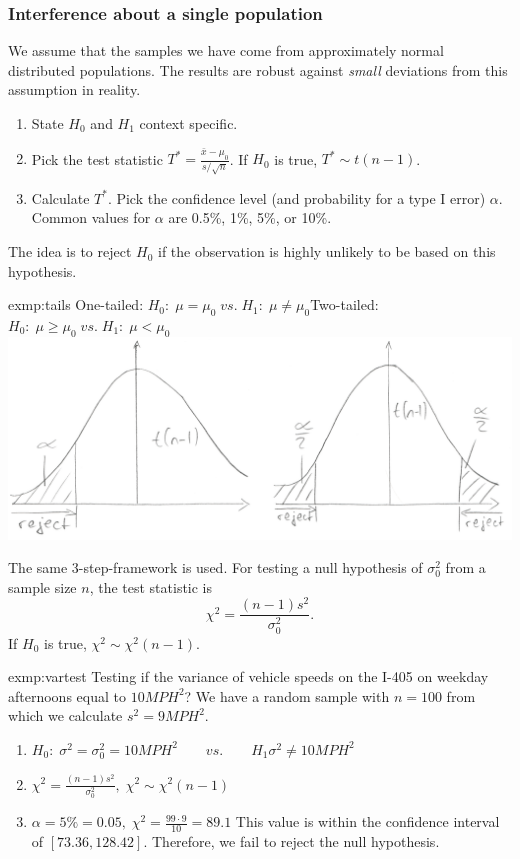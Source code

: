 	\subsubsection{Interference about a single population}
		We assume that the samples we have come from approximately normal distributed populations. The results are robust against \emph{small} deviations from this assumption in reality.
			\begin{enumerate}
				\item State $H_0$ and $H_1$ context specific.
				\item Pick the test statistic $T^*=\frac{\bar{x}-\mu_0}{s/\sqrt{n}}$. If $H_0$ is true, $T^*\sim t(n-1)$.
				\item Calculate $T^*$. Pick the confidence level (and probability for a type I error) $\alpha$. Common values for $\alpha$ are 0.5\%, 1\%, 5\%, or 10\%.
			\end{enumerate}
			The idea is to reject $H_0$ if the observation is highly unlikely to be based on this hypothesis.
			\begin{exmp}{exmp:tails}
				One-tailed: $H_0:\;\mu=\mu_0\; vs. \; H_1:\;\mu\neq\mu_0$\hfill Two-tailed: $H_0:\;\mu\geq\mu_0\; vs. \; H_1:\;\mu<\mu_0$
				\includegraphics[width=\textwidth]{P15-16-tails.png}
			\end{exmp}
			The same 3-step-framework is used. For testing a null hypothesis of $\sigma_0^2$ from a sample size $n$, the test statistic is
			\begin{equation*}
				\chi^2=\frac{(n-1)s^2}{\sigma^2_0}.
			\end{equation*}
			If $H_0$ is true, $\chi^2\sim\chi^2(n-1)$.
			\begin{exmp}{exmp:vartest}
				Testing if the variance of vehicle speeds on the I-405 on weekday afternoons equal to $10 MPH^2$? We have a random sample with $n=100$ from which we calculate $s^2=9 MPH^2$.
				\begin{enumerate}
					\item $H_0:\;\sigma^2=\sigma^2_0=10 MPH^2 \qquad vs. \qquad H_1\sigma^2\neq 10 MPH^2$
					\item $\chi^2=\frac{(n-1)s^2}{\sigma_0^2},\; \chi^2\sim\chi^2(n-1)$
					\item $\alpha=5\%=0.05,\; \chi^2=\frac{99\cdot9}{10}=89.1$ This value is within the confidence interval of $\left[73.36,128.42\right]$. Therefore, we fail to reject the null hypothesis.
				\end{enumerate}
			\end{exmp}

